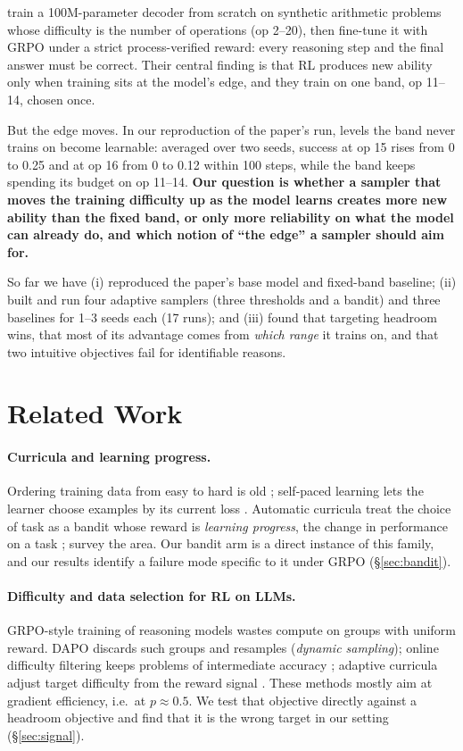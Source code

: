 \documentclass[11pt]{article}
\begin{document}
\citet{zhang2025interplay} train a 100M-parameter decoder from scratch on synthetic arithmetic problems
whose difficulty is the number of operations (op 2--20), then fine-tune it with GRPO under a strict
process-verified reward: every reasoning step and the final answer must be correct. Their central finding is
that RL produces new ability only when training sits at the model's edge, and they train on one band, op
11--14, chosen once.

But the edge moves. In our reproduction of the paper's run, levels the band never trains on become
learnable: averaged over two seeds, success at op 15 rises from 0 to 0.25 and at op 16 from 0 to 0.12 within
100 steps, while the band keeps spending its budget on op 11--14. \textbf{Our question is whether a sampler
that moves the training difficulty up as the model learns creates more new ability than the fixed band, or only more reliability on what
the model can already do, and which notion of ``the edge'' a sampler should aim for.}

So far we have (i) reproduced the paper's base model and fixed-band baseline; (ii) built and run four
adaptive samplers (three thresholds and a bandit) and three baselines for 1--3 seeds each (17 runs); and (iii) found that targeting
headroom wins, that most of its advantage comes from \emph{which range} it trains on, and that two
intuitive objectives fail for identifiable reasons.

\section{Related Work}
\label{sec:related}

\paragraph{Curricula and learning progress.} Ordering training data from easy to hard is old
\citep{bengio2009curriculum}; self-paced learning lets the learner choose examples by its current loss
\citep{kumar2010selfpaced}. Automatic curricula treat the choice of task as a bandit whose reward is
\emph{learning progress}, the change in performance on a task \citep{graves2017automated,
matiisen2019teacher}; \citet{portelas2020survey} survey the area. Our bandit arm is a direct instance of
this family, and our results identify a failure mode specific to it under GRPO (\S\ref{sec:bandit}).

\paragraph{Difficulty and data selection for RL on LLMs.} GRPO-style training of reasoning models
\citep{shao2024deepseekmath,deepseek2025r1} wastes compute on groups with uniform reward. DAPO
\citep{yu2025dapo} discards such groups and resamples (\emph{dynamic sampling}); online difficulty
filtering keeps problems of intermediate accuracy \citep{bae2025online}; adaptive curricula adjust target
difficulty from the reward signal \citep{shi2025adarft}. These methods mostly aim at gradient efficiency,
i.e.\ at $p\approx0.5$. We test that objective directly against a headroom objective and find that it is
the wrong target in our setting (\S\ref{sec:signal}).
\end{document}
